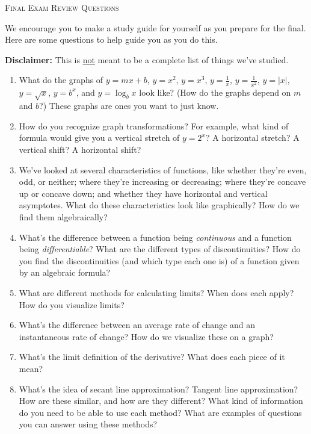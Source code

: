 \documentclass{article}
\theoremstyle{theorem}
\begin{document}
\begin{center}
  \Large\textsc{Final Exam Review Questions}  
\end{center}

We encourage you to make a study guide for yourself as you prepare for the final. Here are some questions to help guide you as you do this.

\textbf{Disclaimer:} This is \uline{not} meant to be a complete list of things we've studied. 

\begin{enumerate}
\item What do the graphs of $y = mx + b$, $y = x^2$, $y = x^3$, $y = \frac{1}{x}$, $y = \frac{1}{x^2}$, $y = |x|$, $y = \sqrt{x}$, $y = b^x$, and $y = \log_b x$ look like? (How do the graphs depend on $m$ and $b$?) These graphs are ones you want to just know.

\item How do you recognize graph transformations? For example, what kind of formula would give you a vertical stretch of $y = 2^x$? A horizontal stretch? A vertical shift? A horizontal shift?

\item We've looked at several characteristics of functions, like whether they're even, odd, or neither; where they're increasing or decreasing; where they're concave up or concave down; and whether they have horizontal and vertical asymptotes. What do these characteristics look like graphically? How do we find them algebraically? 

\item What's the difference between a function being \emph{continuous} and a function being \emph{differentiable}? What are the different types of discontinuities? How do you find the discontinuities (and which type each one is) of a function given by an algebraic formula? 

\item What are different methods for calculating limits? When does each apply? How do you visualize limits? 

\item What's the difference between an average rate of change and an instantaneous rate of change? How do we visualize these on a graph?

\item What's the limit definition of the derivative? What does each piece of it mean? 

\item What's the idea of secant line approximation? Tangent line approximation? How are these similar, and how are they different? What kind of information do you need to be able to use each method? What are examples of questions you can answer using these methods? 


\end{enumerate}
\end{document}
